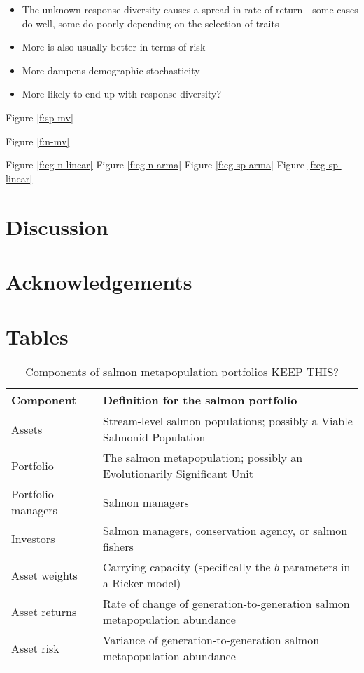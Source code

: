 \begin{itemize}
\begin{itemize}
    \begin{itemize}
    \itemsep1pt\parskip0pt
    \item
      The unknown response diversity causes a spread in rate of return -
      some cases do well, some do poorly depending on the selection of
      traits
    \item
      More is also usually better in terms of risk
    \item
      More dampens demographic stochasticity
    \item
      More likely to end up with response diversity?
    \end{itemize}
  \end{itemize}
\end{itemize}

Figure \ref{f:sp-mv}

Figure \ref{f:n-mv}

Figure \ref{f:eg-n-linear} Figure \ref{f:eg-n-arma} Figure
\ref{f:eg-sp-arma} Figure \ref{f:eg-sp-linear}

\section{Discussion}

\section{Acknowledgements}





\clearpage

\section{Tables}

\begin{table}[h!]
\centering
\small
\caption{Components of salmon metapopulation portfolios KEEP THIS?}
\begin{tabular}{p{3.6cm}p{7.5cm}}
\toprule
Component          & Definition for the salmon portfolio\\
\midrule
Assets             & Stream-level salmon populations; possibly a Viable Salmonid Population\\
Portfolio          & The salmon metapopulation; possibly an Evolutionarily Significant Unit\\
Portfolio managers & Salmon managers\\
Investors          & Salmon managers, conservation agency, or salmon fishers\\
Asset weights      & Carrying capacity (specifically the $b$ parameters in a Ricker model)\\
Asset returns      & Rate of change of generation-to-generation salmon metapopulation abundance\\
Asset risk         & Variance of generation-to-generation salmon metapopulation abundance\\
\bottomrule
\end{tabular}
\label{t:port}
\end{table}

